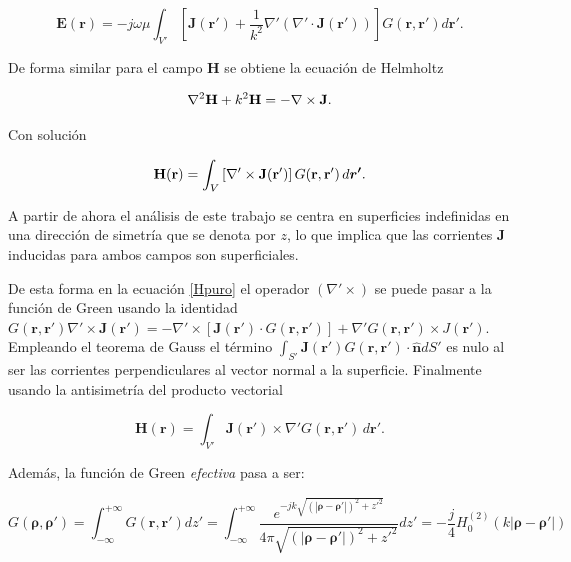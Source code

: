 \documentclass[11pt,a4paper,twoside,pdf]{article}
\numberwithin{equation}{section}
\begin{document}
\begin{equation}
\mathbf{E}(\mathbf{r}) = -j\omega\mu \int_{V'}   \left[  \mathbf{J}(\mathbf{r}') + \frac{1}{k^2} \nabla' (\nabla' \cdot \mathbf{J}(\mathbf{r}'))  \right] G(\mathbf{r}, \mathbf{r}') d\bm{r'}.
\label{Epuro}
\end{equation}



De forma similar para el campo $\mathbf{H}$ se obtiene la ecuación de Helmholtz

\begin{equation}
\label{eq:helmholtz_H}
\nabla^2 \mathbf{H} + k^2 \mathbf{H}
=
- \nabla \times \mathbf{J}.
\notag
\end{equation}

Con solución

\begin{equation}
\mathbf{H}(\mathbf{r})
=
\int_{V}
\left[
\nabla' \times \mathbf{J}(\mathbf{r}')
\right]
G(\mathbf{r},\mathbf{r}')
\, d\bm{r'}.
\label{Hpuro}
\notag
\end{equation}



A partir de ahora el análisis de este trabajo se centra en superficies indefinidas en una dirección de simetría que se denota por $z$, lo que implica que las corrientes $\mathbf{J}$ inducidas para ambos campos son superficiales.

De esta forma en la ecuación \ref{Hpuro} el operador $(\nabla' \times)$ se puede pasar a la función de Green usando la identidad $ G(\mathbf{r}, \mathbf{r'}) \nabla' \times \mathbf{J(\mathbf{r'})} = -\nabla' \times \left[ \mathbf{J}(\mathbf{r'}) \cdot G(\mathbf{r}, \mathbf{r'}) \right]  + \nabla'G(\mathbf{r}, \mathbf{r'}) \times J(\mathbf{r'})$. Empleando el teorema de Gauss el término $\int_{S'}  \mathbf{J}(\mathbf{r'}) G(\mathbf{r}, \mathbf{r'}) \cdot \bm{\hat{n}} dS' $ es nulo al ser las corrientes perpendiculares al vector normal a la superficie. Finalmente usando la antisimetría del producto vectorial


\begin{equation}
\mathbf{H}(\mathbf{r})
=
\int_{V'}
 \mathbf{J}(\mathbf{r}') \times \nabla'
G(\mathbf{r},\mathbf{r}')
\, d\bm{r'}.
\label{Hpuro2}
\end{equation}



Además, la función de Green \textit{efectiva} pasa a ser:

\[
G(\bm{\rho}, \bm{\rho'}) = \int_{-\infty}^{+\infty} G(\mathbf{r}, \mathbf{r'}) dz' = \int_{-\infty}^{+\infty} \frac{e^{-jk\sqrt{(|\bm{\rho} - \bm{\rho'}|)^2 + z'^2 }}}{ 4\pi \sqrt{(|\bm{\rho} - \bm{\rho'}|)^2 + z'^2 } } dz' = -\frac{j}{4} H^{(2)}_0(k|\bm{\rho} - \bm{\rho'}| )
\]
\end{document}
